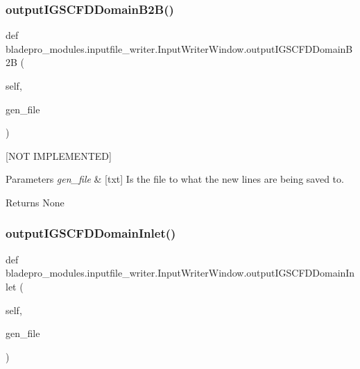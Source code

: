 \subsubsection{\texorpdfstring{output\+I\+G\+S\+C\+F\+D\+Domain\+B2\+B()}{outputIGSCFDDomainB2B()}}
{\footnotesize\ttfamily def bladepro\+\_\+modules.\+inputfile\+\_\+writer.\+Input\+Writer\+Window.\+output\+I\+G\+S\+C\+F\+D\+Domain\+B2B (\begin{DoxyParamCaption}\item[{}]{self,  }\item[{}]{gen\+\_\+file }\end{DoxyParamCaption})}



\mbox{[}N\+OT I\+M\+P\+L\+E\+M\+E\+N\+T\+ED\mbox{]} 


\begin{DoxyParams}{Parameters}
{\em gen\+\_\+file} & \mbox{[}txt\mbox{]} Is the file to what the new lines are being saved to. \\
\hline
\end{DoxyParams}
\begin{DoxyReturn}{Returns}
None 
\end{DoxyReturn}
\hypertarget{classbladepro__modules_1_1inputfile__writer_1_1_input_writer_window_a1a577ed1880def26fc13d02701e9346a}{}\label{classbladepro__modules_1_1inputfile__writer_1_1_input_writer_window_a1a577ed1880def26fc13d02701e9346a} 
\subsubsection{\texorpdfstring{output\+I\+G\+S\+C\+F\+D\+Domain\+Inlet()}{outputIGSCFDDomainInlet()}}
{\footnotesize\ttfamily def bladepro\+\_\+modules.\+inputfile\+\_\+writer.\+Input\+Writer\+Window.\+output\+I\+G\+S\+C\+F\+D\+Domain\+Inlet (\begin{DoxyParamCaption}\item[{}]{self,  }\item[{}]{gen\+\_\+file }\end{DoxyParamCaption})}



